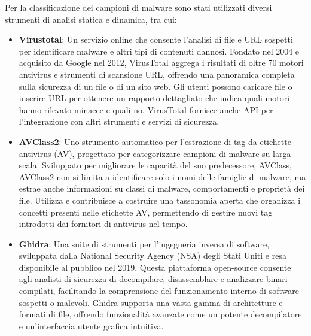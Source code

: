 Per la classificazione dei campioni di malware sono stati utilizzati diversi strumenti di analisi statica e dinamica, tra cui:
\begin{itemize}
    \item \textbf{Virustotal}: Un servizio online che consente l'analisi di file e URL sospetti per identificare malware e altri tipi di contenuti dannosi. Fondato nel 2004 e acquisito da Google nel 2012, VirusTotal aggrega i risultati di oltre 70 motori antivirus e strumenti di scansione URL, offrendo una panoramica completa sulla sicurezza di un file o di un sito web. Gli utenti possono caricare file o inserire URL per ottenere un rapporto dettagliato che indica quali motori hanno rilevato minacce e quali no. VirusTotal fornisce anche API per l'integrazione con altri strumenti e servizi di sicurezza.
    \item \textbf{AVClass2}: Uno strumento automatico per l'estrazione di tag da etichette antivirus (AV), progettato per categorizzare campioni di malware su larga scala. Sviluppato per migliorare le capacità del suo predecessore, AVClass, AVClass2 non si limita a identificare solo i nomi delle famiglie di malware, ma estrae anche informazioni su classi di malware, comportamenti e proprietà dei file. Utilizza e contribuisce a costruire una tassonomia aperta che organizza i concetti presenti nelle etichette AV, permettendo di gestire nuovi tag introdotti dai fornitori di antivirus nel tempo.
    \item \textbf{Ghidra}: Una suite di strumenti per l'ingegneria inversa di software, sviluppata dalla National Security Agency (NSA) degli Stati Uniti e resa disponibile al pubblico nel 2019. Questa piattaforma open-source consente agli analisti di sicurezza di decompilare, disassemblare e analizzare binari compilati, facilitando la comprensione del funzionamento interno di software sospetti o malevoli. Ghidra supporta una vasta gamma di architetture e formati di file, offrendo funzionalità avanzate come un potente decompilatore e un'interfaccia utente grafica intuitiva.
\end{itemize}

